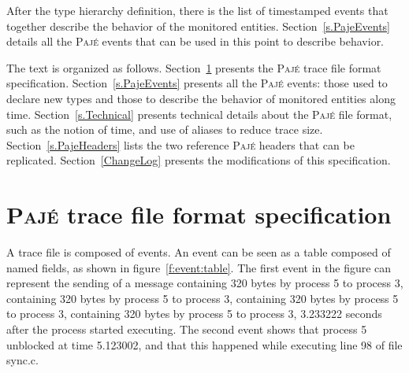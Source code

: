 \documentclass[12pt]{article}
\newcommand{\Paje}{\textsc{Paj\'e}\xspace}
\begin{document}
After the type hierarchy definition, there is the list of timestamped
events that together describe the behavior of the monitored entities.
Section~\ref{s.PajeEvents} details all the \Paje events that can be
used in this point to describe behavior.

The text is organized as follows. Section~\ref{s.Specification}
presents the \Paje trace file format
specification. Section~\ref{s.PajeEvents} presents all the \Paje
events: those used to declare new types and those to describe the
behavior of monitored entities along time. Section~\ref{s.Technical}
presents technical details about the \Paje file format, such as the
notion of time, and use of aliases to reduce trace size.
Section~\ref{s.PajeHeaders} lists the two reference \Paje headers that
can be replicated. Section~\ref{ChangeLog} presents the modifications
of this specification.

\section{\Paje trace file format specification}
\label{s.Specification}

A trace file is composed of events.  An event can be seen as a table
composed of named fields, as shown in figure~\ref{f:event:table}.  The
first event in the figure can represent the sending of a message
containing 320 bytes by process 5 to process 3, containing 320 bytes
by process 5 to process 3, containing 320 bytes by process 5 to
process 3, containing 320 bytes by process 5 to process 3, 3.233222
seconds after the process started executing.  The second event shows
that process 5 unblocked at time 5.123002, and that this happened
while executing line 98 of file sync.c. 
\end{document}

